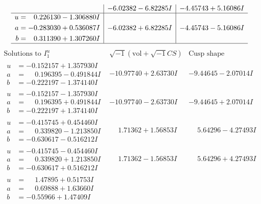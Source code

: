 \documentclass[1p]{elsarticle_modified}
\theoremstyle{definition}
\newcommand{\I}{\sqrt{-1}}
\begin{document}
$$\begin{array}{c|c|c}
 & -6.02382 - 6.82285 I & -4.45743 + 5.16086 I \\ \hline\begin{aligned}
u &= \phantom{-}0.226130 - 1.306880 I \\
a &= -0.283030 + 0.536087 I \\
b &= \phantom{-}0.311390 + 1.307260 I\end{aligned}
 & -6.02382 + 6.82285 I & -4.45743 - 5.16086 I\\
 \hline 
 \end{array}$$\newpage$$\begin{array}{c|c|c}  
\text{Solutions to }I^u_{1}& \I (\text{vol} + \sqrt{-1}CS) & \text{Cusp shape}\\
 \hline 
\begin{aligned}
u &= -0.152157 + 1.357930 I \\
a &= \phantom{-}0.196395 - 0.491844 I \\
b &= -0.222197 - 1.374140 I\end{aligned}
 & -10.97740 + 2.63730 I & -9.44645 - 2.07014 I \\ \hline\begin{aligned}
u &= -0.152157 - 1.357930 I \\
a &= \phantom{-}0.196395 + 0.491844 I \\
b &= -0.222197 + 1.374140 I\end{aligned}
 & -10.97740 - 2.63730 I & -9.44645 + 2.07014 I \\ \hline\begin{aligned}
u &= -0.415745 + 0.454460 I \\
a &= \phantom{-}0.339820 - 1.213850 I \\
b &= -0.630617 - 0.516212 I\end{aligned}
 & \phantom{-}1.71362 + 1.56853 I & \phantom{-}5.64296 - 4.27493 I \\ \hline\begin{aligned}
u &= -0.415745 - 0.454460 I \\
a &= \phantom{-}0.339820 + 1.213850 I \\
b &= -0.630617 + 0.516212 I\end{aligned}
 & \phantom{-}1.71362 - 1.56853 I & \phantom{-}5.64296 + 4.27493 I \\ \hline\begin{aligned}
u &= \phantom{-}1.47895 + 0.51753 I \\
a &= \phantom{-}0.69888 + 1.63660 I \\
b &= -0.55966 + 1.47409 I\end{aligned}

\end{array}$$
\end{document}
